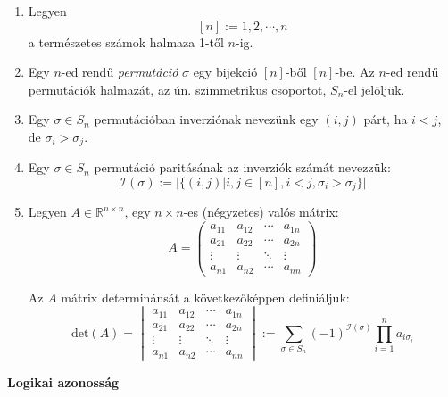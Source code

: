 \documentclass{article}
\begin{document}
\begin{enumerate}[label=(\alph*)]
	\item Legyen \[ [n] := {1, 2, \cdots, n} \]
	a természetes számok halmaza 1-től $n$-ig.
	
	\item Egy $n$-ed rendű \textit{permutáció} $\sigma$  egy 		bijekció $[n]$-ből $[n]$-be. Az $n$-ed rendű permutációk 		halmazát, az ún. szimmetrikus csoportot, $S_n$-el 				jelöljük.
	
	\item Egy $\sigma \in S_n$ permutációban inverziónak 			nevezünk egy $(i, j)$ párt, ha $i < j$, de $\sigma_i > 			\sigma_j$.
	
	\item Egy $\sigma \in S_n$ permutáció paritásának az 			inverziók számát nevezzük:
	\[ \mathcal{I}(\sigma) := \Big|\big\{(i, j) | i, j \in 			[n], i < j , \sigma_i > \sigma_j\big\}\Big| \]
	
	\item Legyen $A \in \mathbb{R}^{n \times n}$, egy $n 			\times n$-es (négyzetes) valós mátrix:
	\[ A = \left(\begin{matrix}
	a_{11} & a_{12} & \cdots & a_{1n} \\
	a_{21} & a_{22} & \cdots & a_{2n} \\
	\vdots & \vdots & \ddots & \vdots \\
	a_{n1} & a_{n2} & \cdots & a_{nn}
	\end{matrix}\right) \]
	
	Az $A$ mátrix determinánsát a következőképpen definiáljuk:
	\[ \text{det}(A) = \begin{vmatrix}
	a_{11} & a_{12} & \cdots & a_{1n} \\
	a_{21} & a_{22} & \cdots & a_{2n} \\
	\vdots & \vdots & \ddots & \vdots \\
	a_{n1} & a_{n2} & \cdots & a_{nn}
	\end{vmatrix} := \sum_{\sigma \in S_n} (-1)^{\mathcal{I}		(\sigma)} \prod_{i=1}^n a_{i\sigma_i} \]
	
\end{enumerate}

\textbf{Logikai azonosság}
\end{document}
